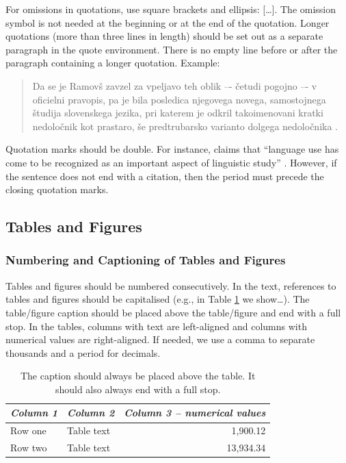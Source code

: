\documentclass{article}
\begin{document}
For omissions in quotations, use square brackets and ellipsis: [\ldots]. The omission symbol is not needed at the beginning or at the end of the quotation. Longer quotations (more than three lines in length) should be set out as a separate paragraph in the quote environment. There is no empty line before or after the paragraph containing a longer quotation. Example:

\begin{quote}
Da se je Ramovš zavzel za vpeljavo teh oblik –- četudi pogojno –- v oficielni pravopis, pa je bila posledica njegovega novega, samostojnega študija slovenskega jezika, pri katerem je odkril takoimenovani kratki nedoločnik kot prastaro, še predtrubarsko varianto dolgega nedoločnika \parencite[198]{vodusek1959}.

\end{quote}
Quotation marks should be double. For instance, \citeauthor{biber1996investigating} claims that ``language use has come to be recognized as an important aspect of linguistic study'' \parencite*[171]{biber1996investigating}. However, if the sentence does not end with a citation, then the period must precede the closing quotation marks.

\subsection{Tables and Figures}

\subsubsection{Numbering and Captioning of Tables and Figures}

Tables and figures should be numbered consecutively. In the text, references to tables and figures should be capitalised (e.g., in Table \ref{slogi} we show\ldots). The table/figure caption should be placed above the table/figure and end with a full stop. In the tables, columns with text are left-aligned and columns with numerical values are right-aligned. If needed, we use a comma to separate thousands and a period for decimals.

\begin{table}[h]
\caption{The caption should always be placed above the table. It should also always end with a full stop.}
\label{slogi}
\begin{tabularx}{\textwidth}{X|X|r}
\toprule
\textit{Column 1} & \textit{Column 2} & \textit{Column 3 -- numerical values} \\ \midrule
Row one          & Table text       & 1,900.12                                      \\
Row two         & Table text       & 13,934.34                                     \\ \bottomrule
\end{tabularx}
\end{table}
\end{document}
